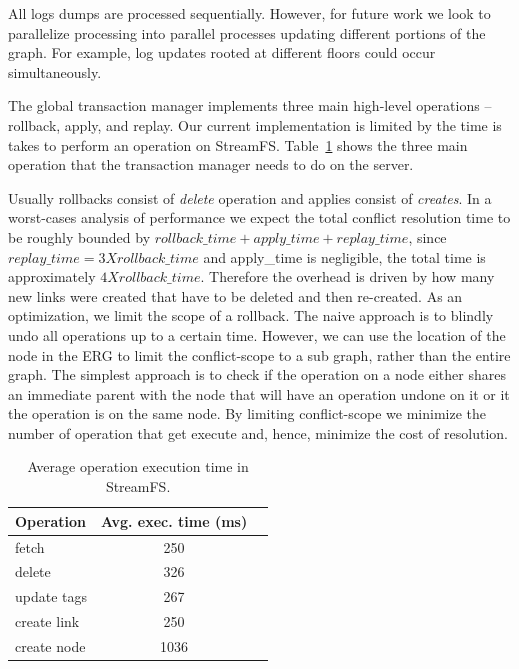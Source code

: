 All logs dumps are processed sequentially.  However, for future work we look to parallelize processing into
parallel processes updating different portions of the graph.  For example, log updates rooted at different floors
could occur simultaneously.

The global transaction manager implements three main high-level operations -- rollback, apply, and replay.  Our current implementation
is limited by the time is takes to perform an operation on StreamFS.  Table~\ref{tab:optimes} shows the three 
main operation that the transaction manager needs to do on the server.

Usually rollbacks consist of \emph{delete} operation and applies consist of \emph{creates}.  In a worst-cases analysis
of performance we expect the total conflict resolution time to be roughly bounded by
$rollback\_time + apply\_time + replay\_time$, since $replay\_time=3 X rollback\_time$ and apply\_time is negligible, 
the total time is approximately $4 X rollback\_time$.  Therefore the overhead is driven by how many new links were created
that have to be deleted and then re-created.  As an optimization, we limit the scope of a rollback.  The naive
approach is to blindly undo all operations up to a certain time.  However, we can use the location of the node
in the ERG to limit the conflict-scope to a sub graph, rather than the entire graph.  The simplest approach is to check if the operation
on a node either shares an immediate parent with the node that will have an operation undone on it or it the operation
is on the same node.  By limiting conflict-scope we minimize the number of operation that get execute and, hence, minimize the 
cost of resolution.


\begin{table}
\begin{center}
  \begin{tabular}{| l | c  c | }
    \hline
    {\textbf Operation } & {\textbf Avg. exec. time (ms) } &\\ \hline
    fetch & 250 &\\ \hline
    delete & 326  &\\ \hline
    update tags & 267  &\\ \hline
    create link & 250  &\\ \hline
    create node & 1036  &\\ 
    \hline
  \end{tabular}
\caption{Average operation execution time in StreamFS.}
\label{tab:optimes}
\end{center}
\end{table}

